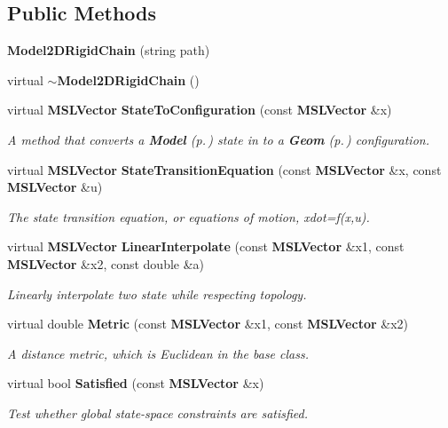 \subsection*{Public Methods}
\begin{CompactItemize}
\item 
{\bf Model2DRigid\-Chain} (string path)
\item 
virtual {\bf $\sim$Model2DRigid\-Chain} ()
\item 
virtual {\bf MSLVector} {\bf State\-To\-Configuration} (const {\bf MSLVector} \&x)
\begin{CompactList}\small\item\em A method that converts a {\bf Model} {\rm (p.\,\pageref{classModel})} state in to a {\bf Geom} {\rm (p.\,\pageref{classGeom})} configuration.\item\end{CompactList}\item 
virtual {\bf MSLVector} {\bf State\-Transition\-Equation} (const {\bf MSLVector} \&x, const {\bf MSLVector} \&u)
\begin{CompactList}\small\item\em The state transition equation, or equations of motion, xdot=f(x,u).\item\end{CompactList}\item 
virtual {\bf MSLVector} {\bf Linear\-Interpolate} (const {\bf MSLVector} \&x1, const {\bf MSLVector} \&x2, const double \&a)
\begin{CompactList}\small\item\em Linearly interpolate two state while respecting topology.\item\end{CompactList}\item 
virtual double {\bf Metric} (const {\bf MSLVector} \&x1, const {\bf MSLVector} \&x2)
\begin{CompactList}\small\item\em A distance metric, which is Euclidean in the base class.\item\end{CompactList}\item 
virtual bool {\bf Satisfied} (const {\bf MSLVector} \&x)
\begin{CompactList}\small\item\em Test whether global state-space constraints are satisfied.\item\end{CompactList}\end{CompactItemize}
